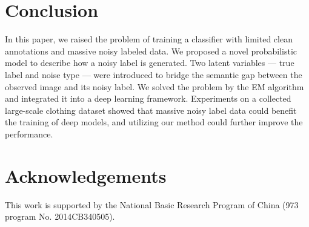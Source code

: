 \documentclass[10pt,twocolumn,letterpaper]{article}
\begin{document}
\section{Conclusion} %
\label{sec:conclusion}
In this paper, we raised the problem of training a classifier with limited clean annotations and massive noisy labeled data. We proposed a novel probabilistic model to describe how a noisy label is generated. Two latent variables --- true label and noise type --- were introduced to bridge the semantic gap between the observed image and its noisy label. We solved the problem by the EM algorithm and integrated it into a deep learning framework. Experiments on a collected large-scale clothing dataset showed that massive noisy label data could benefit the training of deep models, and utilizing our method could further improve the performance.

\section*{Acknowledgements}
\label{sec:acknowledgements}
This work is supported by the National Basic Research Program of China (973 program No. 2014CB340505).


{\small


}
\end{document}

